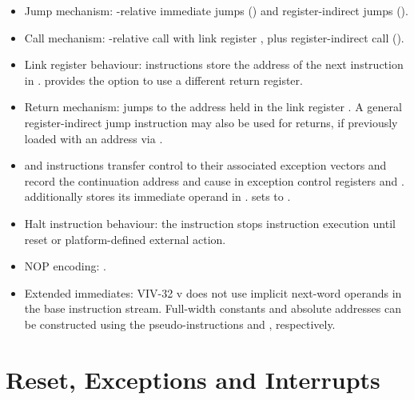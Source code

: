 \begin{itemize}
  \item Jump mechanism: \PC-relative immediate jumps () and
        register-indirect jumps ().
  \item Call mechanism: \PC-relative call with link register , plus
        register-indirect call ().
  \item Link register behaviour:  instructions store the address of
        the next instruction in .  provides the option to
        use a different return register.
  \item Return mechanism:  jumps to the address held in the link
        register . A general register-indirect jump instruction may
        also be used for returns, if previously loaded with an address via
        .
  \item {} and  instructions transfer control to their
        associated exception vectors and record the continuation address and cause in
        exception control registers  and .
         additionally stores its immediate operand in
        .  sets  to .
  \item Halt instruction behaviour: the  instruction stops
        instruction execution until reset or platform-defined external action.
  \item NOP encoding: .
  \item Extended immediates: VIV-32 v\version{} does not use implicit
        next-word operands in the base instruction stream. Full-width constants
        and absolute addresses can be constructed using the pseudo-instructions
         and , respectively.
\end{itemize}

\section{Reset, Exceptions and Interrupts}

